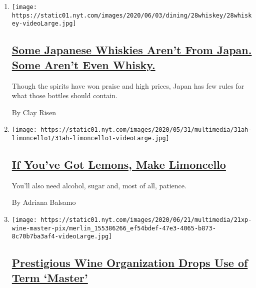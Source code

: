 \begin{enumerate}
\def\labelenumi{\arabic{enumi}.}
\item
  \texttt{[image: https://static01.nyt.com/images/2020/06/03/dining/28whiskey/28whiskey-videoLarge.jpg]}

  \hypertarget{some-japanese-whiskies-arent-from-japan-some-arent-even-whisky}{%
  \subsection{\texorpdfstring{\href{/2020/05/29/dining/japanese-whisky.html}{Some
  Japanese Whiskies Aren't From Japan. Some Aren't Even
  Whisky.}}{Some Japanese Whiskies Aren't From Japan. Some Aren't Even Whisky.}}\label{some-japanese-whiskies-arent-from-japan-some-arent-even-whisky}}

  Though the spirits have won praise and high prices, Japan has few
  rules for what those bottles should contain.

  By Clay Risen
\item
  \texttt{[image: https://static01.nyt.com/images/2020/05/31/multimedia/31ah-limoncello1/31ah-limoncello1-videoLarge.jpg]}

  \hypertarget{if-youve-got-lemons-make-limoncello}{%
  \subsection{\texorpdfstring{\href{/2020/05/29/at-home/coronavirus-how-to-make-limoncello.html}{If
  You've Got Lemons, Make
  Limoncello}}{If You've Got Lemons, Make Limoncello}}\label{if-youve-got-lemons-make-limoncello}}

  You'll also need alcohol, sugar and, most of all, patience.

  By Adriana Balsamo
\item
  \texttt{[image: https://static01.nyt.com/images/2020/06/21/multimedia/21xp-wine-master-pix/merlin\_155386266\_ef54bdef-47e3-4065-b873-8c70b7ba3af4-videoLarge.jpg]}

  \hypertarget{prestigious-wine-organization-drops-use-of-term-master}{%
  \subsection{\texorpdfstring{\href{/2020/06/22/us/wine-master.html}{Prestigious
  Wine Organization Drops Use of Term
  `Master'}}{Prestigious Wine Organization Drops Use of Term `Master'}}\label{prestigious-wine-organization-drops-use-of-term-master}}


\end{enumerate}
